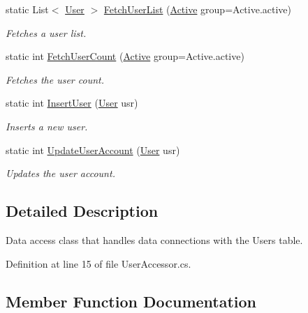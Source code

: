 \begin{DoxyCompactItemize}
static List$<$ \hyperlink{class_business_objects_1_1_user}{User} $>$ \hyperlink{class_data_access_1_1_user_accessor_a9936ef3d80655a8b9e1c63e9969a3c4d}{Fetch\+User\+List} (\hyperlink{namespace_business_objects_a640a4d136931381578aad0a180173cfc}{Active} group=Active.\+active)
\begin{DoxyCompactList}\small\item\em Fetches a user list. \end{DoxyCompactList}\item 
static int \hyperlink{class_data_access_1_1_user_accessor_a54f85a9514bd475a3d5342d31b10ee97}{Fetch\+User\+Count} (\hyperlink{namespace_business_objects_a640a4d136931381578aad0a180173cfc}{Active} group=Active.\+active)
\begin{DoxyCompactList}\small\item\em Fetches the user count. \end{DoxyCompactList}\item 
static int \hyperlink{class_data_access_1_1_user_accessor_a4718ccfb3e6b1b32557c398de4332bf8}{Insert\+User} (\hyperlink{class_business_objects_1_1_user}{User} usr)
\begin{DoxyCompactList}\small\item\em Inserts a new user. \end{DoxyCompactList}\item 
static int \hyperlink{class_data_access_1_1_user_accessor_a7349fc8c87333785420a2896e4c78540}{Update\+User\+Account} (\hyperlink{class_business_objects_1_1_user}{User} usr)
\begin{DoxyCompactList}\small\item\em Updates the user account. \end{DoxyCompactList}\end{DoxyCompactItemize}


\subsection{Detailed Description}
Data access class that handles data connections with the Users table. 



Definition at line 15 of file User\+Accessor.\+cs.



\subsection{Member Function Documentation}
